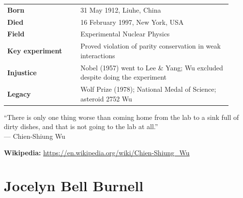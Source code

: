 \documentclass[12pt,a4paper]{article}
\makeatletter
\newcommand{\keyfacts}[1]{%
  \begin{tcolorbox}[factbox, title={Key Facts}]
  \begin{tabular}{@{}p{0.3\linewidth}p{0.62\linewidth}@{}}
  #1
  \end{tabular}
  \end{tcolorbox}
}
\newcommand{\pullquote}[2]{%
  \begin{tcolorbox}[quotebox]
  ``#1''\\[4pt]
  {\small\normalfont\color{medgray}--- #2}
  \end{tcolorbox}
}
\makeatother
\begin{document}
\keyfacts{
\textbf{Born} & 31 May 1912, Liuhe, China\\[3pt]
\textbf{Died} & 16 February 1997, New York, USA\\[3pt]
\textbf{Field} & Experimental Nuclear Physics\\[3pt]
\textbf{Key experiment} & Proved violation of parity conservation in weak interactions\\[3pt]
\textbf{Injustice} & Nobel (1957) went to Lee \& Yang; Wu excluded despite doing the experiment\\[3pt]
\textbf{Legacy} & Wolf Prize (1978); National Medal of Science; asteroid 2752 Wu\\
}

\pullquote{There is only one thing worse than coming home from the lab to a sink full of dirty dishes, and that is not going to the lab at all.}{Chien-Shiung Wu}

\textbf{Wikipedia:} \url{https://en.wikipedia.org/wiki/Chien-Shiung_Wu}

\newpage

\section{Jocelyn Bell Burnell}
\end{document}
